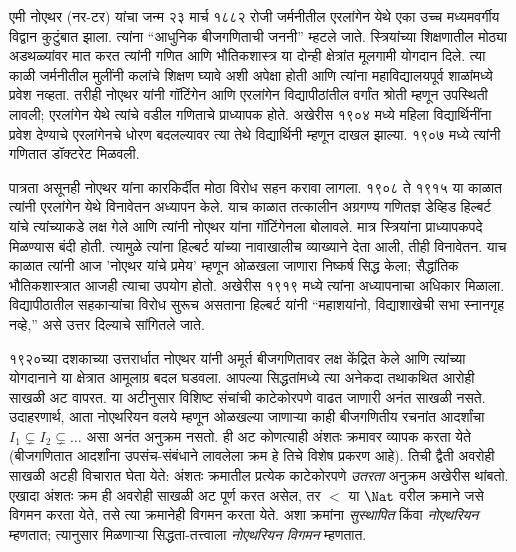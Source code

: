 \documentclass[../../../include/open-logic-section]{subfiles}
\begin{document}



एमी नोएथर (\textsc{नर}-टर) यांचा जन्म २३ मार्च १८८२ रोजी जर्मनीतील एरलांगेन येथे एका उच्च मध्यमवर्गीय विद्वान कुटुंबात झाला. त्यांना “आधुनिक बीजगणिताची जननी” म्हटले जाते. स्त्रियांच्या शिक्षणातील मोठ्या अडथळ्यांवर मात करत त्यांनी गणित आणि भौतिकशास्त्र या दोन्ही क्षेत्रांत मूलगामी योगदान दिले. त्या काळी जर्मनीतील मुलींनी कलांचे शिक्षण घ्यावे अशी अपेक्षा होती आणि त्यांना महाविद्यालयपूर्व शाळांमध्ये प्रवेश नव्हता. तरीही नोएथर यांनी गॉटिंगेन आणि एरलांगेन विद्यापीठांतील वर्गांत श्रोती म्हणून उपस्थिती लावली; एरलांगेन येथे त्यांचे वडील गणिताचे प्राध्यापक होते. अखेरीस १९०४ मध्ये महिला विद्यार्थिनींना प्रवेश देण्याचे एरलांगेनचे धोरण बदलल्यावर त्या तेथे विद्यार्थिनी म्हणून दाखल झाल्या. १९०७ मध्ये त्यांनी गणितात डॉक्टरेट मिळवली.

पात्रता असूनही नोएथर यांना कारकिर्दीत मोठा विरोध सहन करावा लागला. १९०८ ते १९१५ या काळात त्यांनी एरलांगेन येथे विनावेतन अध्यापन केले. याच काळात तत्कालीन अग्रगण्य गणितज्ञ डेव्हिड हिल्बर्ट यांचे त्यांच्याकडे लक्ष गेले आणि त्यांनी नोएथर यांना गॉटिंगेनला बोलावले. मात्र स्त्रियांना प्राध्यापकपदे मिळण्यास बंदी होती. त्यामुळे त्यांना हिल्बर्ट यांच्या नावाखालीच व्याख्याने देता आली, तीही विनावेतन. याच काळात त्यांनी आज 'नोएथर यांचे प्रमेय' म्हणून ओळखला जाणारा निष्कर्ष सिद्ध केला; सैद्धांतिक भौतिकशास्त्रात आजही त्याचा उपयोग होतो. अखेरीस १९१९ मध्ये त्यांना अध्यापनाचा अधिकार मिळाला. विद्यापीठातील सहकाऱ्यांचा विरोध सुरूच असताना हिल्बर्ट यांनी “महाशयांनो, विद्याशाखेची सभा स्नानगृह नव्हे,” असे उत्तर दिल्याचे सांगितले जाते.

१९२०च्या दशकाच्या उत्तरार्धात नोएथर यांनी अमूर्त बीजगणितावर लक्ष केंद्रित केले आणि त्यांच्या योगदानाने या क्षेत्रात आमूलाग्र बदल घडवला. आपल्या सिद्धतांमध्ये त्या अनेकदा तथाकथित आरोही साखळी अट वापरत. या अटीनुसार विशिष्ट संचांची काटेकोरपणे वाढत जाणारी अनंत साखळी नसते. उदाहरणार्थ, आता नोएथरियन वलये म्हणून ओळखल्या जाणाऱ्या काही बीजगणितीय रचनांत आदर्शांचा $I_1
\subsetneq I_2 \subsetneq \dots$ असा अनंत अनुक्रम नसतो. ही अट कोणत्याही अंशतः क्रमावर व्यापक करता येते (बीजगणितात आदर्शांना उपसंच-संबंधाने लावलेला क्रम हे तिचे विशेष प्रकरण आहे). तिची द्वैती अवरोही साखळी अटही विचारात घेता येते: अंशतः क्रमातील प्रत्येक काटेकोरपणे \emph{उतरता} अनुक्रम अखेरीस थांबतो. एखादा अंशतः क्रम ही अवरोही साखळी अट पूर्ण करत असेल, तर $<$ या $\Nat$ वरील क्रमाने जसे विगमन करता येते, तसे त्या क्रमानेही विगमन करता येते. अशा क्रमांना \emph{सुस्थापित} किंवा \emph{नोएथरियन} म्हणतात; त्यानुसार मिळणाऱ्या सिद्धता-तत्त्वाला \emph{नोएथरियन विगमन} म्हणतात.
\end{document}
